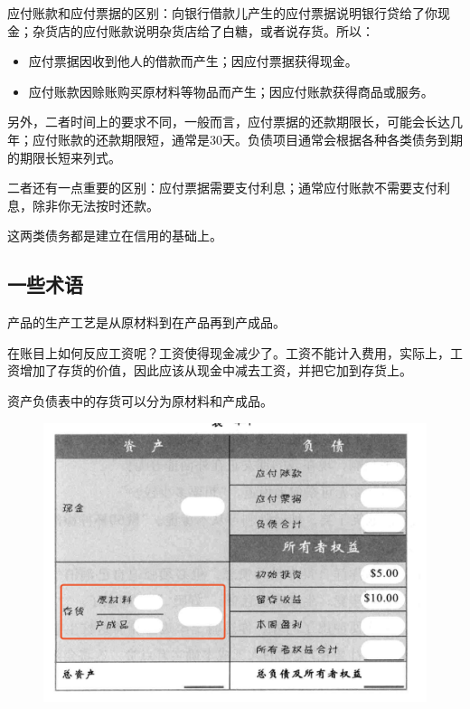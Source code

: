 \documentclass[12pt]{article}
\begin{document}
应付账款和应付票据的区别：向银行借款儿产生的应付票据说明银行贷给了你现金；杂货店的应付账款说明杂货店给了白糖，或者说存货。所以：
\begin{itemize}
\setlength{\itemsep}{0pt}
\setlength{\parsep}{0pt}
\setlength{\parskip}{0pt}
    \item 应付票据因收到他人的借款而产生；因应付票据获得现金。
    \item 应付账款因赊账购买原材料等物品而产生；因应付账款获得商品或服务。
\end{itemize}

另外，二者时间上的要求不同，一般而言，应付票据的还款期限长，可能会长达几年；应付账款的还款期限短，通常是30天。负债项目通常会根据各种各类债务到期的期限长短来列式。

二者还有一点重要的区别：应付票据需要支付利息；通常应付账款不需要支付利息，除非你无法按时还款。

这两类债务都是建立在信用的基础上。

\subsection{一些术语}
产品的生产工艺是从原材料到在产品再到产成品。

在账目上如何反应工资呢？工资使得现金减少了。工资不能计入费用，实际上，工资增加了存货的价值，因此应该从现金中减去工资，并把它加到存货上。

资产负债表中的存货可以分为原材料和产成品。
\begin{figure}[H]
    \centering
    \includegraphics[width=1\textwidth]{fig/accounting_5.png}
\end{figure}
\end{document}
